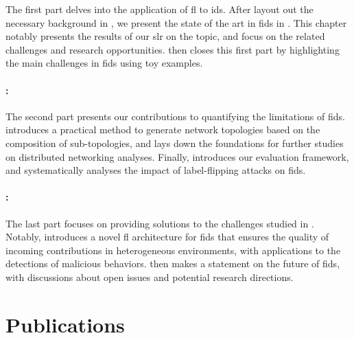 The first part delves into the application of \gls{fl} to \gls{ids}.
After layout out the necessary background in , we present the state of the art in \gls{fids} in .
This chapter notably presents the results of our \gls{slr} on the topic, and focus on the related challenges and research opportunities.
 then closes this first part by highlighting the main challenges in \gls{fids} using toy examples.

\paragraph{:}

The second part presents our contributions to quantifying the limitations of \gls{fids}.
 introduces a practical method to generate network topologies based on the composition of sub-topologies, and lays down the foundations for further studies on distributed networking analyses.
Finally,  introduces our evaluation framework, and systematically analyses the impact of label-flipping attacks on \gls{fids}.

\paragraph{:}

The last part focuses on providing solutions to the challenges studied in .
Notably,  introduces a novel \gls{fl} architecture for \gls{fids} that ensures the quality of incoming contributions in heterogeneous environments, with applications to the detections of malicious behaviors.
 then makes a statement on the future of \gls{fids}, with discussions about open issues and potential research directions.




\section{Publications\label{sec:intro.publications}}

\makeatletter
\newcommand\Setmaxbibnames[1]{\renewcommand\blx@maxbibnames{#1}}
\makeatletter

